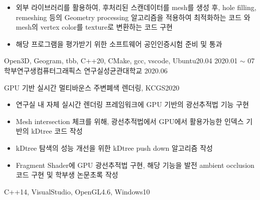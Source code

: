 \begin{experiences}
{\begin{itemize}
                  \item 외부 라이브러리를 활용하여, 후처리된 스캔데이터를 mesh를 생성 후, hole filling, remeshing 등의 Geometry processing 알고리즘을 적용하여 최적화하는 코드 와 mesh의 vertex color를 texture로 변환하는 코드 구현
                  \item 해당 프로그램을 평가받기 위한 소프트웨어 공인인증시험 준비 및 통과
                \end{itemize}
                }
                {Open3D, Geogram, tbb, C++20, CMake, gcc, vscode, Ubuntu20.04}
  \emptySeparator
  \experience
    {2020.01 $\sim$ 07}{학부연구생}{컴퓨터그래픽스 연구실}{성균관대학교}
    {2020.06}{GPU 기반 실시간 멀티바운스 주변폐색 렌더링, KCGS2020
              \vspace{0.2em}
              \begin{itemize}
                \setlength\itemsep{0.5em}
                \item 연구실 내 자체 실시간 렌더링 프레임워크에 GPU 기반의 광선추적법 기능 구현
                \item Mesh intersection 체크를 위해, 광선추적법에서 GPU에서 활용가능한 인덱스 기반의 kDtree 코드 작성
                \item kDtree 탐색의 성능 개선을 위한 kDtree push down 알고리즘 작성
                \item Fragment Shader에 GPU 광선추적법 구현, 해당 기능을 발전 ambient occlusion 코드 구현 및 학부생 논문초록 작성
              \end{itemize}
              }{C++14, VisualStudio, OpenGL4.6, Windows10}
  \emptySeparator
\end{experiences}
